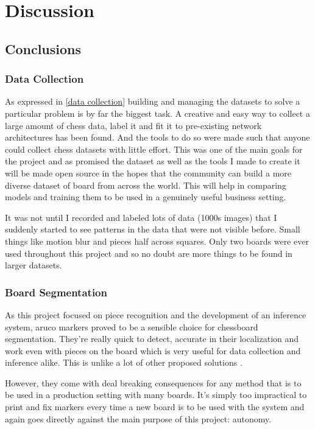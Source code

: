 \chapter{Discussion}
\label{conclusions}

\section{Conclusions}

\subsection{Data Collection}
As expressed in \autoref{data collection} building and managing the datasets to solve a particular problem is by far the biggest task.  
A creative and easy way to collect a large amount of chess data, label it and fit it to pre-existing network architectures has been found.  
And the tools to do so were made such that anyone could collect chess datasets with little effort.
This was one of the main goals for the project and as promised the dataset as well as the tools I made to create it will be made open source in 
the hopes that the community can build a more diverse dataset of board from across the world.  This will help in comparing models and training them 
to be used in a genuinely useful business setting.

It was not until I recorded and labeled lots of data (1000s images) that I suddenly started to see patterns in the data that were not visible before.  
Small things like motion blur and pieces half across squares.  Only two boards were ever used throughout this project and so no doubt are more things 
to be found in larger datasets.

\subsection{Board Segmentation}
As this project focused on piece recognition and the development of an inference system, aruco markers proved to be a sensible choice for chessboard 
segmentation.  They're really quick to detect, accurate in their localization and work even with pieces on the board which is very useful for 
data collection and inference alike. This is unlike a lot of other proposed solutions \cite{Koray2016ACV, bowers_2014, CVChess, nusChessVision}.

However, they come with deal breaking consequences for any method that is to be used in a production setting with many boards.  
It's simply too impractical to print and fix markers every time a new board is to be used with the system and again goes directly against the main 
purpose of this project: autonomy.  

